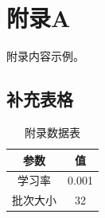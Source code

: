 
\chapter{附录A}

附录内容示例。

\section{补充表格}

\begin{table}[htbp]
    \centering
    \caption{附录数据表}
    \begin{tabular}{cc}
        \toprule
        \textbf{参数} & \textbf{值} \\
        \midrule
        学习率 & 0.001 \\
        批次大小 & 32 \\
        \bottomrule
    \end{tabular}
\end{table}
